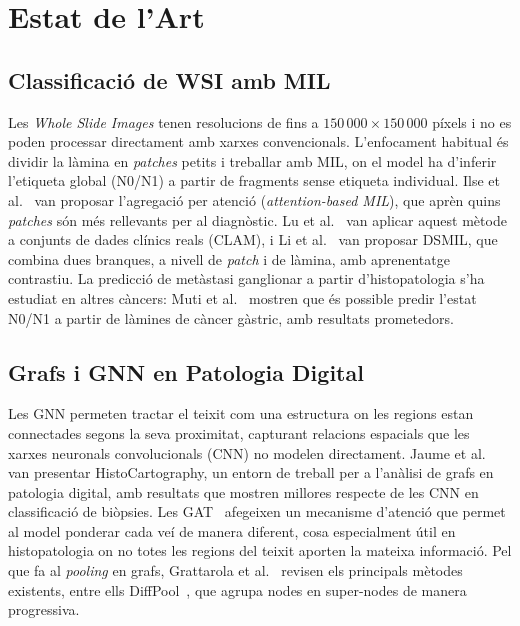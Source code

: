 \documentclass[10pt,a4paper,twocolumn,twoside]{article}
\begin{document}
\section{Estat de l'Art}

\subsection{Classificació de WSI amb MIL}

Les \textit{Whole Slide Images} tenen resolucions de fins a $150\,000 \times 150\,000$
píxels i no es poden processar directament amb xarxes convencionals. L'enfocament habitual
és dividir la làmina en \textit{patches} petits i treballar amb MIL, on el model ha
d'inferir l'etiqueta global (N0/N1) a partir de fragments sense
etiqueta individual. Ilse et al.~\cite{ilse2018attentionbaseddeepmultipleinstance} van
proposar l'agregació per atenció (\textit{attention-based MIL}), que aprèn quins
\textit{patches} són més rellevants per al diagnòstic. Lu et al.~\cite{lu2020dataefficientweaklysupervised}
van aplicar aquest mètode a conjunts de dades clínics reals (CLAM), i Li et
al.~\cite{li2021dualstreammultipleinstancelearning} van proposar DSMIL, que combina dues
branques, a nivell de \textit{patch} i de làmina, amb aprenentatge contrastiu. La
predicció de metàstasi ganglionar a partir d'histopatologia s'ha estudiat en altres càncers:
Muti et al.~\cite{muti2023deep} mostren que és possible predir l'estat N0/N1 a partir de
làmines de càncer gàstric, amb resultats prometedors.

\subsection{Grafs i GNN en Patologia Digital}

Les GNN permeten tractar el teixit com una estructura on les
regions estan connectades segons la seva proximitat, capturant relacions espacials que les
xarxes neuronals convolucionals (CNN) no modelen directament. Jaume et al.~\cite{jaume2021histocartographytoolkitgraphanalytics}
van presentar HistoCartography, un entorn de treball per a l'anàlisi de grafs en patologia
digital, amb resultats que mostren millores respecte de les CNN en classificació de
biòpsies. Les GAT~\cite{veličković2018graphattentionnetworks} afegeixen un mecanisme
d'atenció que permet al model ponderar cada veí de manera diferent, cosa especialment útil
en histopatologia on no totes les regions del teixit aporten la mateixa informació. Pel que
fa al \textit{pooling} en grafs, Grattarola et al.~\cite{Grattarola_2024} revisen els
principals mètodes existents, entre ells DiffPool~\cite{ying2019hierarchicalgraphrepresentationlearning},
que agrupa nodes en super-nodes de manera progressiva.
\end{document}
